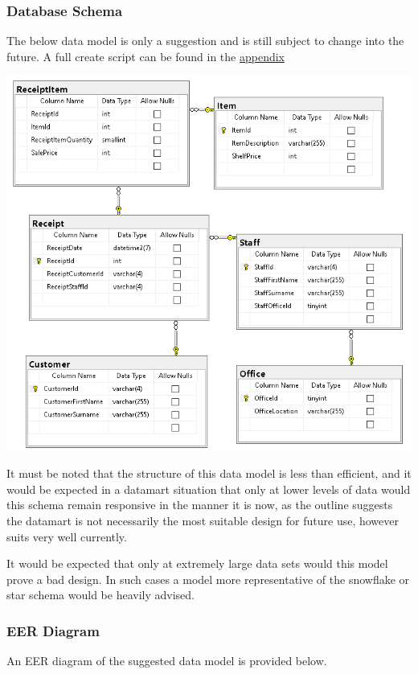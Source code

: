 \documentclass{article}
\begin{document}
        \subsubsection{Database Schema}
            The below data model is only a suggestion and is still subject to change into the future. A full create script can be found in the \hyperref[sec:Appendix]{\color{blue}appendix}
                \begin{center}
                    \includegraphics[width=\textwidth,keepaspectratio]{Images/schema.PNG}
                \end{center}
            It must be noted that the structure of this data model is 
            less than efficient, and it would be expected in a datamart
            situation that only at lower levels of data would this schema
            remain responsive in the manner it is now, as the outline
            suggests the datamart is not necessarily the most suitable
            design for future use, however suits very well currently.
            \par
            It would be expected that only at extremely large data sets
            would this model prove a bad design. In such cases a model 
            more representative of the snowflake or star schema would be
            heavily advised.

    \newpage
        \subsubsection{EER Diagram}
            An EER diagram of the suggested data model is provided below. 
\end{document}
